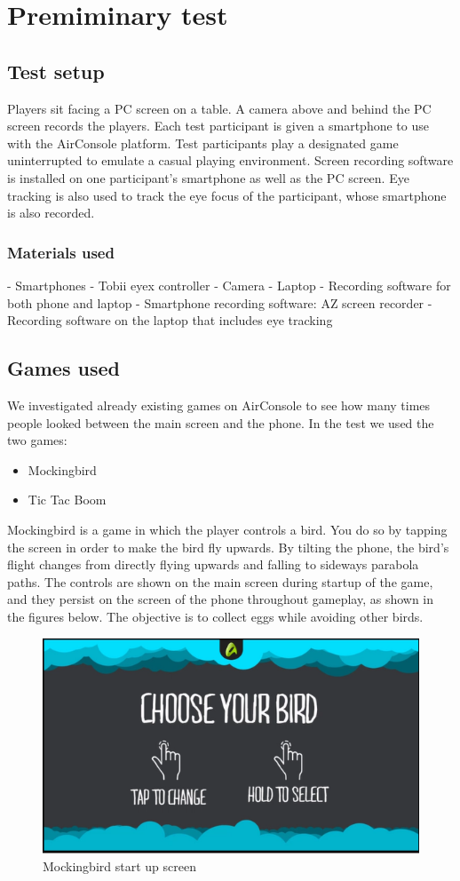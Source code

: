 \chapter{Premiminary test}\label{ch:PreTest}
\section{Test setup}
Players sit facing a PC screen on a table. A camera above and behind the PC screen records the players. Each test participant is given a smartphone to use with the AirConsole platform. Test participants play a designated game uninterrupted to emulate a casual playing environment. Screen recording software is installed on one participant’s smartphone as well as the PC screen. Eye tracking is also used to track the eye focus of the participant, whose smartphone is also recorded.


\subsection{Materials used}
- Smartphones
- Tobii eyex controller
- Camera
- Laptop
- Recording software for both phone and laptop
	- Smartphone recording software: AZ screen recorder
	- Recording software on the laptop that includes eye tracking
	
\section{Games used}
We investigated already existing games on AirConsole to see how many times people looked between the main screen and the phone. In the test we used the two games:
\begin{itemize}
\item Mockingbird
\item Tic Tac Boom
\end{itemize}

Mockingbird is a game in which the player controls a bird. You do so by tapping the screen in order to make the bird fly upwards. By tilting the phone, the bird’s flight changes from directly flying upwards and falling to sideways parabola paths. The controls are shown on the main screen during startup of the game, and they persist on the screen of the phone throughout gameplay, as shown in the figures below. The objective is to collect eggs while avoiding other birds.
\begin{figure}
\centering
\includegraphics[width=\textwidth]{figures/birdSelect}
\caption{Mockingbird start up screen}
\end{figure}